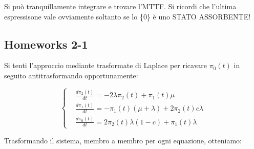 Si può tranquillamente integrare e trovare l'MTTF. Si ricordi che l'ultima espressisone vale ovviamente soltanto se lo \{0\} è uno STATO ASSORBENTE!

\subsection{Homeworks 2-1}

Si tenti l'approccio mediante trasformate di Laplace per ricavare $\pi_0(t)$ in seguito antitrasformando opportunamente:

\[
	\left\{
	\begin{aligned}
	&\frac{d \pi_2(t)}{dt} = -2\lambda\pi_2(t) +\pi_1(t)\mu\\
	&\frac{d \pi_1(t)}{dt} = -\pi_1(t)(\mu+\lambda) + 2\pi_2(t)c\lambda\\
	&\frac{d \pi_0(t)}{dt} = 2\pi_2(t)\lambda(1-c) + \pi_1(t)\lambda
	\end{aligned}
	\right.
\]

Trasformando il sistema, membro a membro per ogni equazione, otteniamo:

